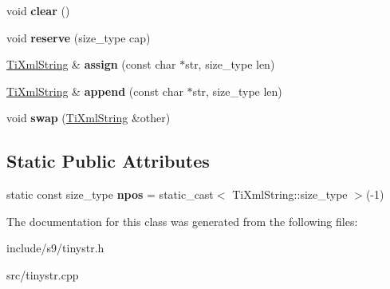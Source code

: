 \begin{DoxyCompactItemize}
\item 
\hypertarget{classTiXmlString_ab20e06e4c666abf3bdbfb3a1191d4888}{void {\bfseries clear} ()}\label{classTiXmlString_ab20e06e4c666abf3bdbfb3a1191d4888}

\item 
\hypertarget{classTiXmlString_a88ecf9f0f00cb5c67b6b637958d7049c}{void {\bfseries reserve} (size\-\_\-type cap)}\label{classTiXmlString_a88ecf9f0f00cb5c67b6b637958d7049c}

\item 
\hypertarget{classTiXmlString_ac72f3d9149b7812c1e6c59402014d0d5}{\hyperlink{classTiXmlString}{\-Ti\-Xml\-String} \& {\bfseries assign} (const char $\ast$str, size\-\_\-type len)}\label{classTiXmlString_ac72f3d9149b7812c1e6c59402014d0d5}

\item 
\hypertarget{classTiXmlString_ad44b21700d2ec24a511367b222b643fb}{\hyperlink{classTiXmlString}{\-Ti\-Xml\-String} \& {\bfseries append} (const char $\ast$str, size\-\_\-type len)}\label{classTiXmlString_ad44b21700d2ec24a511367b222b643fb}

\item 
\hypertarget{classTiXmlString_aa392cbc180752a79f007f4f9280c7762}{void {\bfseries swap} (\hyperlink{classTiXmlString}{\-Ti\-Xml\-String} \&other)}\label{classTiXmlString_aa392cbc180752a79f007f4f9280c7762}

\end{DoxyCompactItemize}
\subsection*{\-Static \-Public \-Attributes}
\begin{DoxyCompactItemize}
\item 
\hypertarget{classTiXmlString_a8f4422d227088dc7bec96f479b275d0a}{static const size\-\_\-type {\bfseries npos} = static\-\_\-cast$<$ \-Ti\-Xml\-String\-::size\-\_\-type $>$(-\/1)}\label{classTiXmlString_a8f4422d227088dc7bec96f479b275d0a}

\end{DoxyCompactItemize}


\-The documentation for this class was generated from the following files\-:\begin{DoxyCompactItemize}
\item 
include/s9/tinystr.\-h\item 
src/tinystr.\-cpp\end{DoxyCompactItemize}

